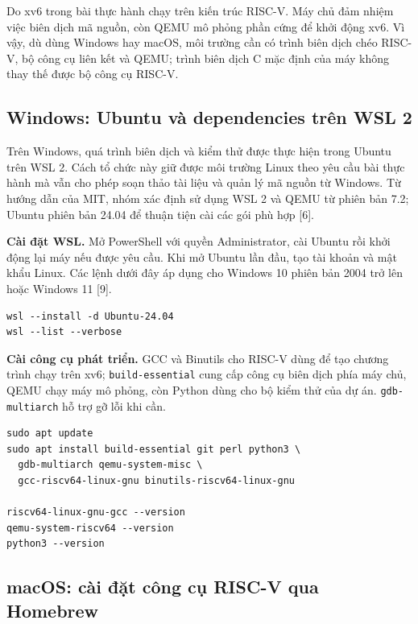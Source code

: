 \documentclass[12pt,a4paper]{article}
\begin{document}
Do xv6 trong bài thực hành chạy trên kiến trúc RISC-V. Máy chủ đảm nhiệm việc biên dịch mã nguồn, còn QEMU mô phỏng phần cứng để khởi động xv6. Vì vậy, dù dùng Windows hay macOS, môi trường cần có trình biên dịch chéo RISC-V, bộ công cụ liên kết và QEMU; trình biên dịch C mặc định của máy không thay thế được bộ công cụ RISC-V.

\subsection{Windows: Ubuntu và dependencies trên WSL 2}

Trên Windows, quá trình biên dịch và kiểm thử được thực hiện trong Ubuntu trên WSL 2. Cách tổ chức này giữ được môi trường Linux theo yêu cầu bài thực hành mà vẫn cho phép soạn thảo tài liệu và quản lý mã nguồn từ Windows. Từ hướng dẫn của MIT, nhóm xác định sử dụng WSL 2 và QEMU từ phiên bản 7.2; Ubuntu phiên bản 24.04 để thuận tiện cài các gói phù hợp [6].

\textbf{Cài đặt WSL.} Mở PowerShell với quyền Administrator, cài Ubuntu rồi khởi động lại máy nếu được yêu cầu. Khi mở Ubuntu lần đầu, tạo tài khoản và mật khẩu Linux. Các lệnh dưới đây áp dụng cho Windows 10 phiên bản 2004 trở lên hoặc Windows 11 [9].

\begin{terminalbox}
\small
\begin{verbatim}
wsl --install -d Ubuntu-24.04
wsl --list --verbose
\end{verbatim}
\end{terminalbox}

\textbf{Cài công cụ phát triển.} GCC và Binutils cho RISC-V dùng để tạo chương trình chạy trên xv6; \texttt{build-essential} cung cấp công cụ biên dịch phía máy chủ, QEMU chạy máy mô phỏng, còn Python dùng cho bộ kiểm thử của dự án. \texttt{gdb-multiarch} hỗ trợ gỡ lỗi khi cần.

\begin{terminalbox}
\small
\begin{verbatim}
sudo apt update
sudo apt install build-essential git perl python3 \
  gdb-multiarch qemu-system-misc \
  gcc-riscv64-linux-gnu binutils-riscv64-linux-gnu

riscv64-linux-gnu-gcc --version
qemu-system-riscv64 --version
python3 --version
\end{verbatim}
\end{terminalbox}


\subsection{macOS: cài đặt công cụ RISC-V qua Homebrew}
\end{document}
